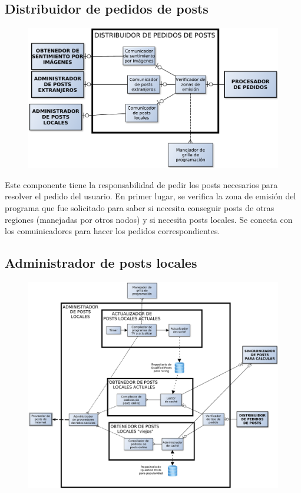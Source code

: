 \subsection{Distribuidor de pedidos de posts}

\begin{figure}[H]
\centering
\includegraphics[width=\textwidth]{graph/distribuidor.pdf}
\end{figure}

Este componente tiene la responsabilidad de pedir los posts necesarios para resolver el pedido del usuario. En primer lugar, se verifica la zona de emisión del programa que fue solicitado para saber si necesita conseguir posts de otras regiones (manejadas por otros nodos) y si necesita posts locales. Se conecta con los comuinicadores para hacer los pedidos correspondientes.

\subsection{Administrador de posts locales}

\begin{figure}[H]
\centering
\includegraphics[width=\textwidth]{graph/adminlocal.pdf}
\end{figure}

